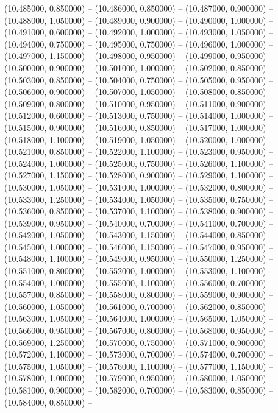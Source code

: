 (10.485000, 0.850000) -- 
(10.486000, 0.850000) -- 
(10.487000, 0.900000) -- 
(10.488000, 1.050000) -- 
(10.489000, 0.900000) -- 
(10.490000, 1.000000) -- 
(10.491000, 0.600000) -- 
(10.492000, 1.000000) -- 
(10.493000, 1.050000) -- 
(10.494000, 0.750000) -- 
(10.495000, 0.750000) -- 
(10.496000, 1.000000) -- 
(10.497000, 1.150000) -- 
(10.498000, 0.950000) -- 
(10.499000, 0.950000) -- 
(10.500000, 0.900000) -- 
(10.501000, 1.000000) -- 
(10.502000, 0.850000) -- 
(10.503000, 0.850000) -- 
(10.504000, 0.750000) -- 
(10.505000, 0.950000) -- 
(10.506000, 0.900000) -- 
(10.507000, 1.050000) -- 
(10.508000, 0.850000) -- 
(10.509000, 0.800000) -- 
(10.510000, 0.950000) -- 
(10.511000, 0.900000) -- 
(10.512000, 0.600000) -- 
(10.513000, 0.750000) -- 
(10.514000, 1.000000) -- 
(10.515000, 0.900000) -- 
(10.516000, 0.850000) -- 
(10.517000, 1.000000) -- 
(10.518000, 1.100000) -- 
(10.519000, 1.050000) -- 
(10.520000, 1.000000) -- 
(10.521000, 0.850000) -- 
(10.522000, 1.100000) -- 
(10.523000, 0.950000) -- 
(10.524000, 1.000000) -- 
(10.525000, 0.750000) -- 
(10.526000, 1.100000) -- 
(10.527000, 1.150000) -- 
(10.528000, 0.900000) -- 
(10.529000, 1.100000) -- 
(10.530000, 1.050000) -- 
(10.531000, 1.000000) -- 
(10.532000, 0.800000) -- 
(10.533000, 1.250000) -- 
(10.534000, 1.050000) -- 
(10.535000, 0.750000) -- 
(10.536000, 0.850000) -- 
(10.537000, 1.100000) -- 
(10.538000, 0.900000) -- 
(10.539000, 0.950000) -- 
(10.540000, 0.700000) -- 
(10.541000, 0.700000) -- 
(10.542000, 1.050000) -- 
(10.543000, 1.150000) -- 
(10.544000, 0.850000) -- 
(10.545000, 1.000000) -- 
(10.546000, 1.150000) -- 
(10.547000, 0.950000) -- 
(10.548000, 1.100000) -- 
(10.549000, 0.950000) -- 
(10.550000, 1.250000) -- 
(10.551000, 0.800000) -- 
(10.552000, 1.000000) -- 
(10.553000, 1.100000) -- 
(10.554000, 1.000000) -- 
(10.555000, 1.100000) -- 
(10.556000, 0.700000) -- 
(10.557000, 0.850000) -- 
(10.558000, 0.800000) -- 
(10.559000, 0.900000) -- 
(10.560000, 1.050000) -- 
(10.561000, 0.700000) -- 
(10.562000, 0.850000) -- 
(10.563000, 1.050000) -- 
(10.564000, 1.000000) -- 
(10.565000, 1.050000) -- 
(10.566000, 0.950000) -- 
(10.567000, 0.800000) -- 
(10.568000, 0.950000) -- 
(10.569000, 1.250000) -- 
(10.570000, 0.750000) -- 
(10.571000, 0.900000) -- 
(10.572000, 1.100000) -- 
(10.573000, 0.700000) -- 
(10.574000, 0.700000) -- 
(10.575000, 1.050000) -- 
(10.576000, 1.100000) -- 
(10.577000, 1.150000) -- 
(10.578000, 1.000000) -- 
(10.579000, 0.950000) -- 
(10.580000, 1.050000) -- 
(10.581000, 0.900000) -- 
(10.582000, 0.700000) -- 
(10.583000, 0.850000) -- 
(10.584000, 0.850000) -- 
